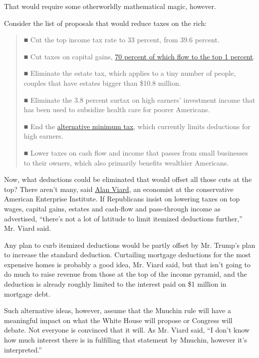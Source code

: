 That would require some otherworldly mathematical magic, however.

Consider the list of proposals that would reduce taxes on the rich:

\begin{quote}
■ Cut the top income tax rate to 33 percent, from 39.6 percent.

■ Cut taxes on capital gains,
\href{https://www.taxpolicycenter.org/sites/default/files/alfresco/publication-pdfs/904606-Tax-Reform-and-the-Tax-Treatment-of-Capital-Gains.PDF}{70
percent of which flow to the top 1 percent}.

■ Eliminate the estate tax, which applies to a tiny number of people,
couples that have estates bigger than \$10.8 million.

■ Eliminate the 3.8 percent surtax on high earners' investment income
that has been used to subsidize health care for poorer Americans.

■ End the
\href{http://topics.nytimes.com/top/reference/timestopics/subjects/a/alternative_minimum_tax/index.html?inline=nyt-classifier}{alternative
minimum tax}, which currently limits deductions for high earners.

■ Lower taxes on cash flow and income that passes from small businesses
to their owners, which also primarily benefits wealthier Americans.
\end{quote}

Now, what deductions could be eliminated that would offset all those
cuts at the top? There aren't many, said
\href{http://www.aei.org/scholar/alan-d-viard/}{Alan Viard}, an
economist at the conservative American Enterprise Institute. If
Republicans insist on lowering taxes on top wages, capital gains,
estates and cash-flow and pass-through income as advertised, ``there's
not a lot of latitude to limit itemized deductions further,'' Mr. Viard
said.

Any plan to curb itemized deductions would be partly offset by Mr.
Trump's plan to increase the standard deduction. Curtailing mortgage
deductions for the most expensive homes is probably a good idea, Mr.
Viard said, but that isn't going to do much to raise revenue from those
at the top of the income pyramid, and the deduction is already roughly
limited to the interest paid on \$1 million in mortgage debt.

Such alternative ideas, however, assume that the Mnuchin rule will have
a meaningful impact on what the White House will propose or Congress
will debate. Not everyone is convinced that it will. As Mr. Viard said,
``I don't know how much interest there is in fulfilling that statement
by Mnuchin, however it's interpreted.''

